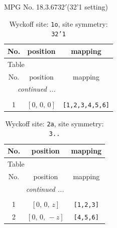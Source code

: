 \documentclass[fleqn,8pt]{jsarticle}
\begin{document}
\setcounter{MaxMatrixCols}{32}

\renewcommand{\tablename}{Table~}
\renewcommand{\figurename}{Figure~}
\begin{center}
\LARGE
MPG No. 18.3.67\quad$32'$\quad(32'1 setting)
\end{center}
\renewcommand{\arraystretch}{1.2}
\begin{longtable}{ccc}
\caption{Wyckoff site: {\tt 1o}, site symmetry: {\tt 32'1}}
 \\
 \hline \hline
No. & position & mapping \\ \hline \endfirsthead

\multicolumn{2}{l}{\tablename\ \thetable{}} \\
 \hline \hline
No. & position & mapping \\ \hline \endhead

 \hline \hline
\multicolumn{2}{r}{\footnotesize\it continued ...} \\ \endfoot

 \hline \hline
\multicolumn{2}{r}{} \\ \endlastfoot

1 & $\left[ 0,\, 0,\, 0 \right]$ & {\tt [1,2,3,4,5,6]} \\
\end{longtable}
\renewcommand{\arraystretch}{1.2}
\begin{longtable}{ccc}
\caption{Wyckoff site: {\tt 2a}, site symmetry: {\tt 3..}}
 \\
 \hline \hline
No. & position & mapping \\ \hline \endfirsthead

\multicolumn{2}{l}{\tablename\ \thetable{}} \\
 \hline \hline
No. & position & mapping \\ \hline \endhead

 \hline \hline
\multicolumn{2}{r}{\footnotesize\it continued ...} \\ \endfoot

 \hline \hline
\multicolumn{2}{r}{} \\ \endlastfoot

1 & $\left[ 0,\, 0,\, z \right]$ & {\tt [1,2,3]} \\ \hline
2 & $\left[ 0,\, 0,\, - z \right]$ & {\tt [4,5,6]} \\
\end{longtable}
\renewcommand{\arraystretch}{1.2}
\end{document}
